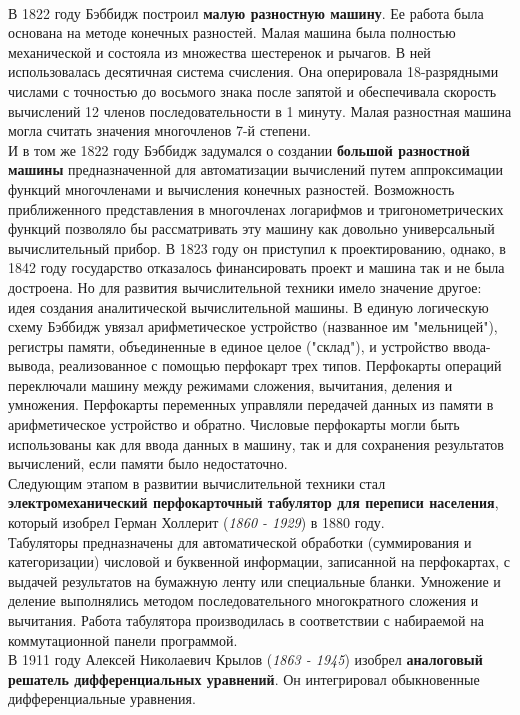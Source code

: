 \\В 1822 году Бэббидж построил \textbf{малую разностную машину}. Ее работа была основана на методе конечных разностей. Малая машина была полностью механической и состояла из множества шестеренок и рычагов. В ней использовалась десятичная система счисления. Она оперировала 18-разрядными числами с точностью до восьмого знака после запятой и обеспечивала скорость вычислений 12 членов последовательности в 1 минуту. Малая разностная машина могла считать значения многочленов 7-й степени.
\\И в том же 1822 году Бэббидж задумался о создании \textbf{большой разностной машины} предназначенной для автоматизации вычислений путем аппроксимации функций многочленами и вычисления конечных разностей. Возможность приближенного представления в многочленах логарифмов и тригонометрических функций позволяло бы рассматривать эту машину как довольно универсальный вычислительный прибор. В 1823 году он приступил к проектированию, однако, в 1842 году государство отказалось финансировать проект и машина так и не была достроена. Но для развития вычислительной техники имело значение другое: идея создания аналитической вычислительной машины. В единую логическую схему Бэббидж увязал арифметическое устройство (названное им "мельницей"), регистры памяти, объединенные в единое целое ("склад"), и устройство ввода-вывода, реализованное с помощью перфокарт трех типов. Перфокарты операций переключали машину между режимами сложения, вычитания, деления и умножения. Перфокарты переменных управляли передачей данных из памяти в арифметическое устройство и обратно. Числовые перфокарты могли быть использованы как для ввода данных в машину, так и для сохранения результатов вычислений, если памяти было недостаточно.
\\Следующим этапом в развитии вычислительной техники стал \textbf{электромеханический перфокарточный табулятор для переписи населения}, который изобрел Герман Холлерит (\emph{1860 - 1929}) в 1880 году.
\\Табуляторы предназначены для автоматической обработки (суммирования и категоризации) числовой и буквенной информации, записанной на перфокартах, с выдачей результатов на бумажную ленту или специальные бланки. Умножение и деление выполнялись методом последовательного многократного сложения и вычитания. Работа табулятора производилась в соответствии с набираемой на коммутационной панели программой.
\\В 1911 году Алексей Николаевич Крылов (\emph{1863 - 1945}) изобрел \textbf{аналоговый решатель дифференциальных уравнений}. Он интегрировал обыкновенные дифференциальные уравнения.
